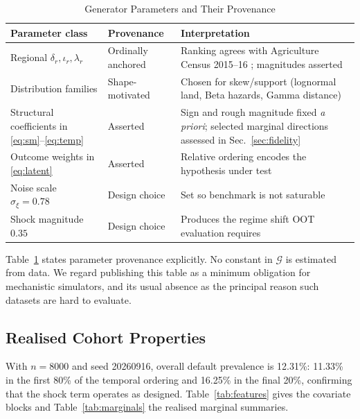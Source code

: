 \documentclass[journal]{IEEEtran}
\newcommand{\dgp}{\ensuremath{\mathcal{G}}}
\begin{document}
\begin{table}[!t]
\caption{Generator Parameters and Their Provenance}
\label{tab:params}
\centering
\footnotesize
\begin{tabular}{@{}p{2.2cm}p{1.4cm}p{3.7cm}@{}}
\toprule
Parameter class & Provenance & Interpretation \\
\midrule
Regional $\delta_r,\iota_r,\lambda_r$ & Ordinally anchored & Ranking agrees with Agriculture Census 2015--16 \cite{agcensus2016}; magnitudes asserted \\
Distribution families & Shape-motivated & Chosen for skew/support (lognormal land, Beta hazards, Gamma distance) \\
Structural coefficients in \eqref{eq:sm}--\eqref{eq:temp} & Asserted & Sign and rough magnitude fixed \textit{a priori}; selected marginal directions assessed in Sec.~\ref{sec:fidelity} \\
Outcome weights in \eqref{eq:latent} & Asserted & Relative ordering encodes the hypothesis under test \\
Noise scale $\sigma_\xi=0.78$ & Design choice & Set so benchmark is not saturable \\
Shock magnitude $0.35$ & Design choice & Produces the regime shift OOT evaluation requires \\
\bottomrule
\end{tabular}
\end{table}

Table~\ref{tab:params} states parameter provenance explicitly. No constant in $\dgp$ is estimated from data. We regard publishing this table as a minimum obligation for mechanistic simulators, and its usual absence as the principal reason such datasets are hard to evaluate.

\subsection{Realised Cohort Properties}
With $n=8000$ and seed 20260916, overall default prevalence is 12.31\%: 11.33\% in the first 80\% of the temporal ordering and 16.25\% in the final 20\%, confirming that the shock term operates as designed. Table~\ref{tab:features} gives the covariate blocks and Table~\ref{tab:marginals} the realised marginal summaries.
\end{document}
